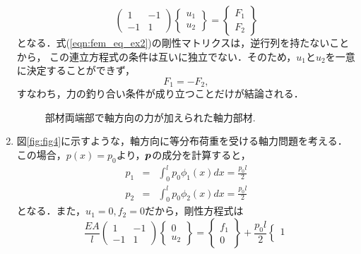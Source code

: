 \documentclass[10pt,a4j]{jarticle}
\begin{document}
\begin{enumerate}
\begin{equation}
	\left(
	\begin{array}{cc}
		1 & -1 \\
		-1 & 1
	\end{array}
	\right)
	\left\{
	\begin{array}{c}
		u_1 \\
		u_2
	\end{array}
	\right\}
	=
	\left\{
	\begin{array}{c}
		F_1\\
		F_2
	\end{array}
	\right\}
	\label{eqn:fem_eq_ex2}
\end{equation}
となる．式(\ref{eqn:fem_eq_ex2})の剛性マトリクスは，逆行列を持たないことから，
この連立方程式の条件は互いに独立でない．そのため，$u_1$と$u_2$を一意に決定することができず，
\begin{equation}
	F_1=-F_2, 
\end{equation}
すなわち，力の釣り合い条件が成り立つことだけが結論される．
\begin{figure}[h]
	\begin{center}
	\end{center}
	\caption{部材両端部で軸方向の力が加えられた軸力部材.} 
	\label{fig:fig3}
\end{figure}
\item
図\ref{fig:fig4}に示すような，軸方向に等分布荷重を受ける軸力問題を考える．
この場合，$p(x)=p_0$より，$\mbox{\boldmath $p$}$の成分を計算すると，
\begin{eqnarray}
	p_1 &= & \int_0^l p_0 \phi_1(x) dx = \frac{p_0l}{2} 
	\label{eqn:}
	\\
	p_2 &= & \int_0^l p_0 \phi_2(x) dx = \frac{p_0l}{2} 
	\label{eqn:}
\end{eqnarray}
となる．また，$u_1=0, f_2=0$だから，剛性方程式は
\begin{equation}
	\frac{EA}{l}
	\left(
	\begin{array}{cc}
		1 & -1 \\
		-1 & 1
	\end{array}
	\right)
	\left\{
	\begin{array}{c}
		0 \\
		u_2
	\end{array}
	\right\}
	=
	\left\{
	\begin{array}{c}
		f_1 \\
		0	
	\end{array}
	\right\}
	+
	\frac{p_0l}{2}
	\left\{
	\begin{array}{c}
		1 \\ 

\end{array}
\end{equation}
\end{enumerate}
\end{document}
